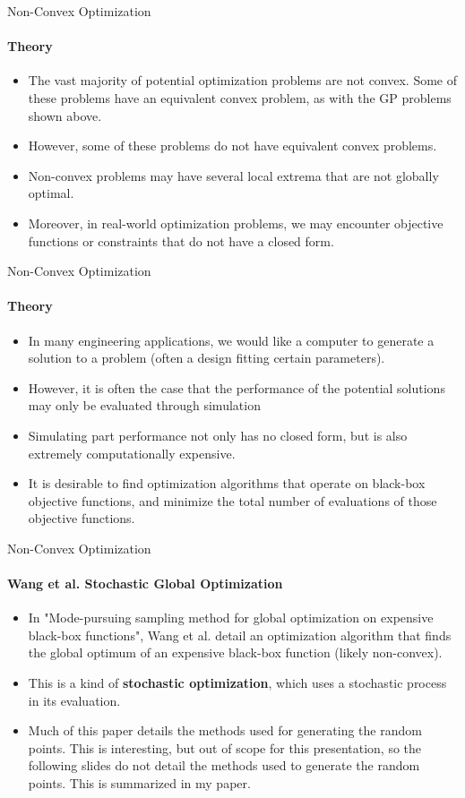 \documentclass{beamer}
\begin{document}
	\begin{frame}{Non-Convex Optimization}
		\framesubtitle{Theory}
		\begin{itemize}
			\item The vast majority of potential optimization problems are not convex. Some of these problems have an equivalent convex problem, as with the GP problems shown above.
			\item However, some of these problems do not have equivalent convex problems.
			\item Non-convex problems may have several local extrema that are not globally optimal.
			\item Moreover, in real-world optimization problems, we may encounter objective functions or constraints that do not have a closed form.
		\end{itemize}
	\end{frame}
	
	\begin{frame}{Non-Convex Optimization}
		\framesubtitle{Theory}
		\begin{itemize}
			\item In many engineering applications, we would like a computer to generate a solution to a problem (often a design fitting certain parameters).
			\item However, it is often the case that the performance of the potential solutions may only be evaluated through simulation
			\item Simulating part performance not only has no closed form, but is also extremely computationally expensive.
			\item It is desirable to find optimization algorithms that operate on black-box objective functions, and minimize the total number of evaluations of those objective functions.
		\end{itemize}
	\end{frame}
	
	\begin{frame}{Non-Convex Optimization}
		\framesubtitle{Wang et al. Stochastic Global Optimization}
		\begin{itemize}
			\item In "Mode-pursuing sampling method for global optimization on expensive black-box functions", Wang et al. detail an optimization algorithm that finds the global optimum of an expensive black-box function (likely non-convex).
			\item This is a kind of \textbf{stochastic optimization}, which uses a stochastic process in its evaluation.
			\item Much of this paper details the methods used for generating the random points. This is interesting, but out of scope for this presentation, so the following slides do not detail the methods used to generate the random points. This is summarized in my paper.
		\end{itemize}
	\end{frame}
	
\end{document}
